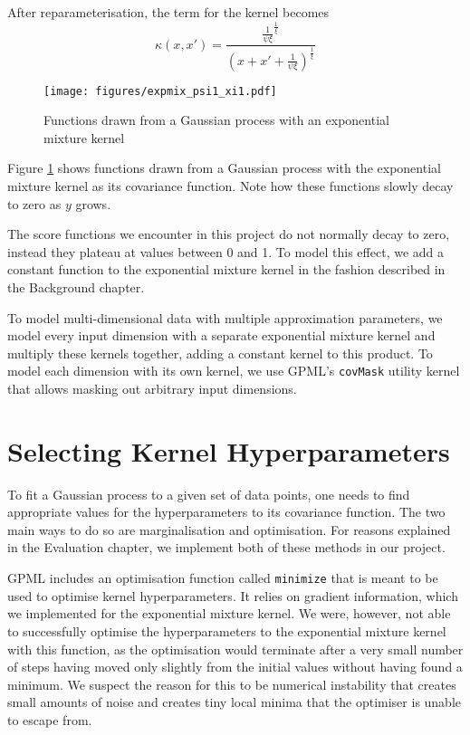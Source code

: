 \documentclass[a4paper,12pt,twoside,openright]{report}
\begin{document}
After reparameterisation, the term for the kernel becomes
\begin{equation}
\kappa(x, x') = \frac{\frac{1}{\psi\xi}^{\frac{1}{\xi}}}{(x+x'+\frac{1}{\psi\xi})^{\frac{1}{\xi}}}
\end{equation}

\begin{figure}
\centering

  \centering
  \texttt{[image: figures/expmix\_psi1\_xi1.pdf]}
  \caption{Functions drawn from a Gaussian process with an exponential mixture kernel}
  \label{expmix11}
\end{figure}

Figure \ref{expmix11} shows functions drawn from a Gaussian process with the exponential mixture kernel as its covariance function. Note how these functions slowly decay to zero as $y$ grows.

The score functions we encounter in this project do not normally decay to zero, instead they plateau at values between 0 and 1. To model this effect, we add a constant function to the exponential mixture kernel in the fashion described in the Background chapter.

To model multi-dimensional data with multiple approximation parameters, we model every input dimension with a separate exponential mixture kernel and multiply these kernels together, adding a constant kernel to this product. To model each dimension with its own kernel, we use GPML's \texttt{covMask} utility kernel that allows masking out arbitrary input dimensions.

\section{Selecting Kernel Hyperparameters} 

To fit a Gaussian process to a given set of data points, one needs to find appropriate values for the hyperparameters to its covariance function. The two main ways to do so are marginalisation and optimisation. For reasons explained in the Evaluation chapter, we implement both of these methods in our project.

GPML includes an optimisation function called \texttt{minimize} that is meant to be used to optimise kernel hyperparameters. It relies on gradient information, which we implemented for the exponential mixture kernel. We were, however, not able to successfully optimise the hyperparameters to the exponential mixture kernel with this function, as the optimisation would terminate after a very small number of steps having moved only slightly from the initial values without having found a minimum. We suspect the reason for this to be numerical instability that creates small amounts of noise and creates tiny local minima that the optimiser is unable to escape from. 
\end{document}
